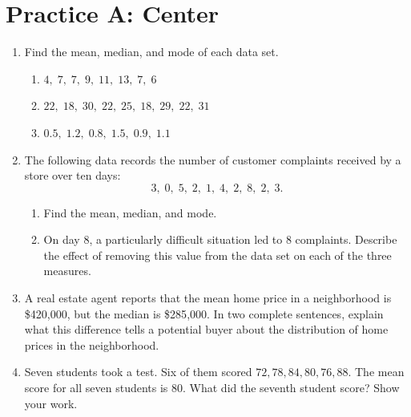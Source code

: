 
\clearpage
\section*{Practice A: Center}
\begin{enumerate}[label=A\arabic*.,leftmargin=2.5em,itemsep=10pt]
  \item Find the mean, median, and mode of each data set.
    \begin{enumerate}[label=(\alph*), itemsep=5pt]
      \item $4,\; 7,\; 7,\; 9,\; 11,\; 13,\; 7,\; 6$
      \item $22,\; 18,\; 30,\; 22,\; 25,\; 18,\; 29,\;
             22,\; 31$
      \item $0.5,\; 1.2,\; 0.8,\; 1.5,\; 0.9,\; 1.1$
    \end{enumerate}

  \item The following data records the number of customer
    complaints received by a store over ten days:
    \[ 3,\; 0,\; 5,\; 2,\; 1,\; 4,\; 2,\; 8,\; 2,\; 3. \]
    \begin{enumerate}[label=(\alph*), itemsep=4pt]
      \item Find the mean, median, and mode.
      \item On day 8, a particularly difficult situation led
        to 8 complaints. Describe the effect of removing this
        value from the data set on each of the three measures.
    \end{enumerate}

  \item A real estate agent reports that the mean home price
    in a neighborhood is \$420{,}000, but the median is
    \$285{,}000.
    In two complete sentences, explain what this difference
    tells a potential buyer about the distribution of home
    prices in the neighborhood.

  \item Seven students took a test. Six of them scored
    $72, 78, 84, 80, 76, 88$.
    The mean score for all seven students is $80$.
    What did the seventh student score?
    Show your work.

\end{enumerate}

\clearpage
